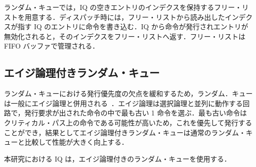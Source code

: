 ランダム・キューでは，IQ の空きエントリのインデクスを保持するフリー・リストを用意する．ディスパッチ時には，フリー・リストから読み出したインデクスが指す IQ のエントリに命令を書き込む．IQ から命令が発行されエントリが無効化されると，そのインデクスをフリー・リストへ返す．フリー・リストは FIFO バッファで管理される．

\subsection{エイジ論理付きランダム・キュー}
ランダム・キューにおける発行優先度の欠点を緩和するため，ランダム．キューは一般にエイジ論理と併用される~\cite{Alpha21464}．エイジ論理は選択論理と並列に動作する回路で，発行要求が出された命令の中で最も古い 1 命令を選ぶ．最も古い命令はクリティカル・パス上の命令である可能性が高いため，これを優先して発行することができ，結果としてエイジ論理付きランダム・キューは通常のランダム・キューと比較して性能が大きく向上する．

本研究における IQ は，エイジ論理付きのランダム・キューを使用する．
